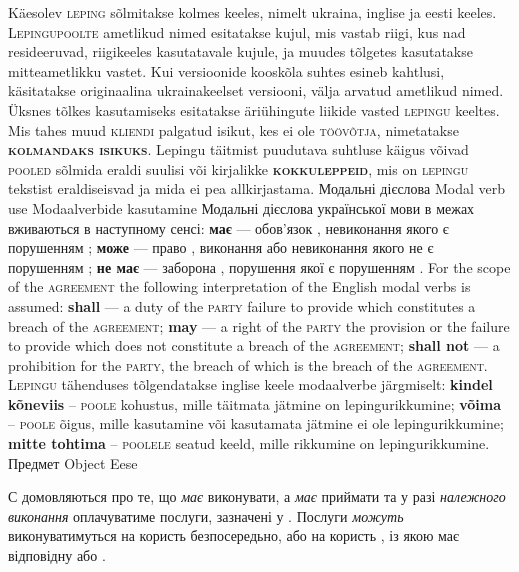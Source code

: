 \begin{Form}
\begin{paracol}{3}
{        }
        {Käesolev \textsc{leping} sõlmitakse kolmes keeles, nimelt ukraina, inglise ja eesti keeles. L\textsc{epingupoolte} ametlikud nimed esitatakse kujul, mis vastab riigi, kus nad resideeruvad, riigikeeles kasutatavale kujule, ja muudes tõlgetes kasutatakse mitteametlikku vastet. Kui versioonide kooskõla suhtes esineb kahtlusi, käsitatakse originaalina ukrainakeelset versiooni, välja arvatud ametlikud nimed. Üksnes tõlkes kasutamiseks esitatakse  äriühingute liikide vasted \textsc{lepingu} keeltes. Mis tahes muud \textsc{kliendi} palgatud isikut, kes ei ole \textsc{töövõtja}, nimetatakse \textbf{\textsc{kolmandaks isikuks}}. Lepingu täitmist puudutava suhtluse käigus võivad \textsc{pooled} sõlmida eraldi suulisi või kirjalikke \textbf{\textsc{kokkuleppeid}}, mis on \textsc{lepingu} tekstist eraldiseisvad ja mida ei pea allkirjastama.}
      \clause
        {Модальні дієслова}
        {Modal verb use}
        {Modaalverbide kasutamine}
        {Модальні дієслова української мови в межах  вживаються в наступному сенсі: \textbf{має} — обов’язок , невиконання якого є порушенням ; \textbf{може} — право , виконання або невиконання якого не є порушенням ; \textbf{не має} — заборона , порушення якої є порушенням .}
        {For the scope of the \textsc{agreement} the following interpretation of the English modal verbs is assumed: \textbf{shall} — a duty of the \textsc{party} failure to provide which constitutes a breach of the \textsc{agreement}; \textbf{may} — a right of the \textsc{party} the provision or the failure to provide which does not constitute a breach of the \textsc{agreement}; \textbf{shall not} — a prohibition for the \textsc{party}, the breach of which is the breach of the \textsc{agreement}.}
        {L\textsc{epingu} tähenduses tõlgendatakse inglise keele modaalverbe järgmiselt: \textbf{kindel kõneviis} – \textsc{poole} kohustus, mille täitmata jätmine on lepingurikkumine; \textbf{võima} – \textsc{poole} õigus, mille kasutamine või kasutamata jätmine ei ole lepingurikkumine; \textbf{mitte tohtima} – \textsc{poolele} seatud keeld, mille rikkumine on lepingurikkumine.}
      \clause
        {Предмет}
        {Object}
        {Eese}
        {С домовляються про те, що  \textit{має} виконувати, а  \textit{має} приймати та у разі \emph{належного виконання} оплачуватиме послуги, зазначені у . Послуги \textit{можуть} виконуватимуться на користь  безпосередьно, або на користь , із якою  має відповідну  або .

}
\end{paracol}
\end{Form}
